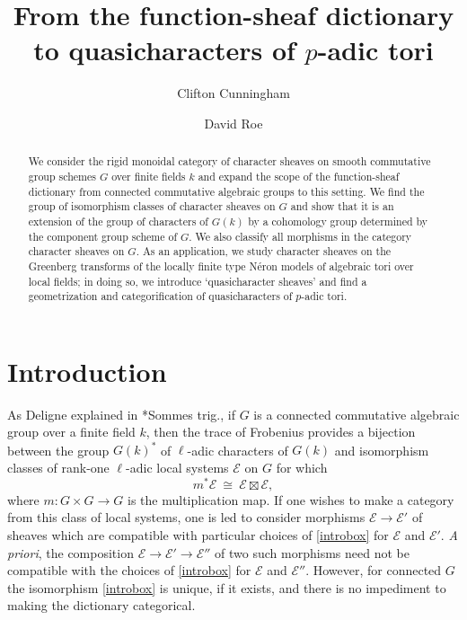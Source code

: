 \documentclass[10pt]{amsart}
\title{From the function-sheaf dictionary to quasicharacters of $p$-adic tori}
\author{Clifton Cunningham}
\author{David Roe}
\theoremstyle{plain}
\theoremstyle{definition}
\theoremstyle{remark}
\newcommand{\Fq}{k}
\newcommand{\iso}{{\ \cong\ }}
\newcommand{\cs}[1]{{\mathcal{#1}}}
\begin{document}
\begin{abstract}
We consider the rigid monoidal category of character sheaves on smooth commutative group schemes $G$ over finite fields $k$ and expand the scope of the function-sheaf dictionary from connected commutative algebraic groups to this setting.
We find the group of isomorphism classes of character sheaves on $G$ and show that it is an extension of the group of characters of $G(k)$ by a cohomology group determined by the component group scheme of $G$.
We also classify all morphisms in the category character sheaves on $G$.
As an application, we study character sheaves on the Greenberg transforms of the locally finite type N\'eron models of algebraic tori over local fields; in doing so, we introduce `quasicharacter sheaves' and find a geometrization and categorification of quasi\-characters of $p$-adic tori.
\end{abstract}

\maketitle

\section*{Introduction}


As Deligne explained in \cite{deligne:SGA4.5}*{Sommes trig.}, if $G$ is a connected commutative algebraic group over a finite field $k$, then the trace of Frobenius provides a bijection between the group $G(\Fq)^*$ of $\ell$-adic characters of $G(\Fq)$ and isomorphism classes of rank-one $\ell$-adic local systems $\mathcal{E}$ on $G$ for which 
\begin{equation}\label{introbox}
m^* \cs{E} \iso \cs{E} \boxtimes \cs{E},
\end{equation}
where $m : G\times G\to G$ is the multiplication map.
%
If one wishes to make a category from this class of local systems, one is led to consider morphisms $\cs{E} \to \cs{E}'$ of sheaves which are compatible with particular choices of \eqref{introbox} for $\cs{E}$ and $\cs{E'}$. 
{\it A priori}, the composition $\cs{E} \to \cs{E}' \to \cs{E}''$ of two such morphisms need not be compatible with the choices of \eqref{introbox} for $\cs{E}$ and $\cs{E}''$.
 However, for connected $G$ the isomorphism \eqref{introbox} is unique, if it exists, and there is no impediment to making the dictionary categorical.
\end{document}
